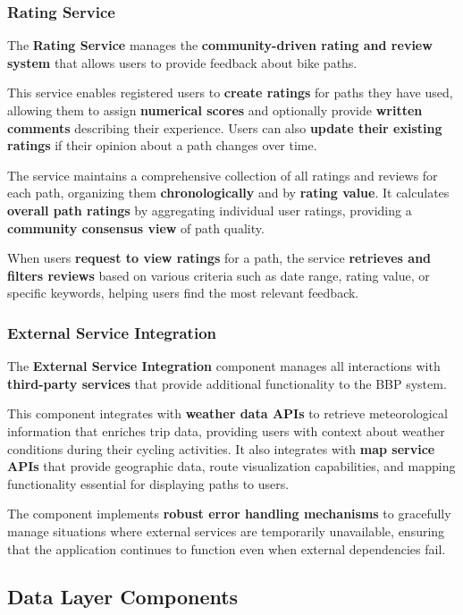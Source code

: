 \subsubsection{Rating Service}
The \textbf{Rating Service} manages the \textbf{community-driven rating and review system} that allows users to provide feedback about bike paths. 

This service enables registered users to \textbf{create ratings} for paths they have used, allowing them to assign \textbf{numerical scores} and optionally provide \textbf{written comments} describing their experience. Users can also \textbf{update their existing ratings} if their opinion about a path changes over time. 

The service maintains a comprehensive collection of all ratings and reviews for each path, organizing them \textbf{chronologically} and by \textbf{rating value}. It calculates \textbf{overall path ratings} by aggregating individual user ratings, providing a \textbf{community consensus view} of path quality. 

When users \textbf{request to view ratings} for a path, the service \textbf{retrieves and filters reviews} based on various criteria such as date range, rating value, or specific keywords, helping users find the most relevant feedback.

\subsubsection{External Service Integration}
The \textbf{External Service Integration} component manages all interactions with \textbf{third-party services} that provide additional functionality to the BBP system. 

This component integrates with \textbf{weather data APIs} to retrieve meteorological information that enriches trip data, providing users with context about weather conditions during their cycling activities. It also integrates with \textbf{map service APIs} that provide geographic data, route visualization capabilities, and mapping functionality essential for displaying paths to users. 

The component implements \textbf{robust error handling mechanisms} to gracefully manage situations where external services are temporarily unavailable, ensuring that the application continues to function even when external dependencies fail. 

\subsection{Data Layer Components}

